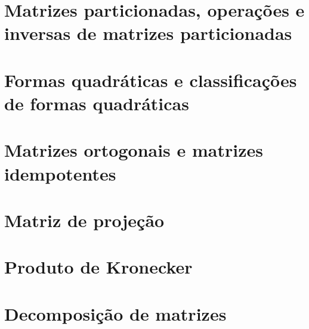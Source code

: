 \documentclass[a4paper,12pt,twoside]{book}
\begin{document}
\chapter[Matrizes particionadas]{Matrizes particionadas, operações e inversas de matrizes particionadas}
\chapter[Formas quadráticas]{Formas quadráticas e classificações de formas quadráticas}
\chapter{Matrizes ortogonais e matrizes idempotentes}
\chapter{Matriz de projeção}
\chapter{Produto de Kronecker}
\chapter{Decomposição de matrizes}
\end{document}
